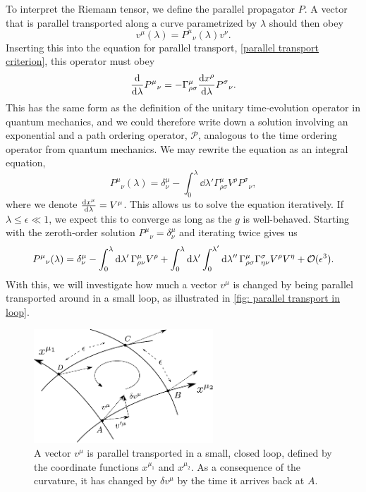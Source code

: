 To interpret the Riemann tensor, we define the parallel propagator $P$.
A vector that is parallel transported along a curve parametrized by $\lambda$ should then obey
%
\begin{equation}
    v^\mu(\lambda) = P^\mu{}_\nu(\lambda) v^\nu.
\end{equation}
%
Inserting this into the equation for parallel transport, \autoref{parallel transport criterion}, this operator must obey
%
\begin{equation}
    \odv{}{\lambda} P^\mu{}_\nu = - \Gamma^\mu_{\rho \sigma}  \odv{x^\rho}{\lambda}P^\sigma{}_\nu.
\end{equation}
%
This has the same form as the definition of the unitary time-evolution operator in quantum mechanics, and we could therefore write down a solution involving an exponential and a path ordering operator, $\mathcal P$, analogous to the time ordering operator from quantum mechanics.
We may rewrite the equation as an integral equation,
%
\begin{equation}
    P^\mu{}_\nu(\lambda) = \delta^\mu_\nu 
    - \int^\lambda_0 \dd \lambda' \Gamma^\mu_{\rho \sigma} V^\rho P^\sigma{}_\nu,
\end{equation}
%
where we denote $\odv{x^\mu}{\lambda} = V^\mu$.
This allows us to solve the equation iteratively.
If $\lambda \leq \epsilon \ll 1$, we expect this to converge as long as the $g$ is well-behaved.
Starting with the zeroth-order solution $P^{\mu}{}_\nu = \delta^\mu_\nu$ and iterating twice gives us
%
\begin{equation}
    \label{iterative paralell propagator}
    P^\mu{}_\nu(\lambda) 
    = 
    \delta^\mu_\nu 
    - \int_0^\lambda \text{d} \lambda' \, 
    \Gamma^\mu_{\rho \nu} V^\rho
    + \int_0^{\lambda} \text{d} \lambda ' \int_0^{\lambda'} \text{d} \lambda ''\,
    \Gamma^\mu_{\rho \sigma} \Gamma^\sigma_{\eta \nu} V^\rho V^\eta
    + \mathcal O(\epsilon^3).
\end{equation}
%
With this, we will investigate how much a vector $v^\mu$ is changed by being parallel transported around in a small loop, as illustrated in \autoref{fig: parallel transport in loop}.

\begin{figure}[H]
    \centering
    \includegraphics[width=0.6\textwidth]{figurer/parallel_transport.pdf}
    \caption{A vector $v^\mu$ is parallel transported in a small, closed loop, defined by the coordinate functions $x^{\mu_1}$ and $x^{\mu_2}$.
    As a consequence of the curvature, it has changed by $\delta v^\mu$ by the time it arrives back at $A$.}
    \label{fig: parallel transport in loop}
\end{figure}


